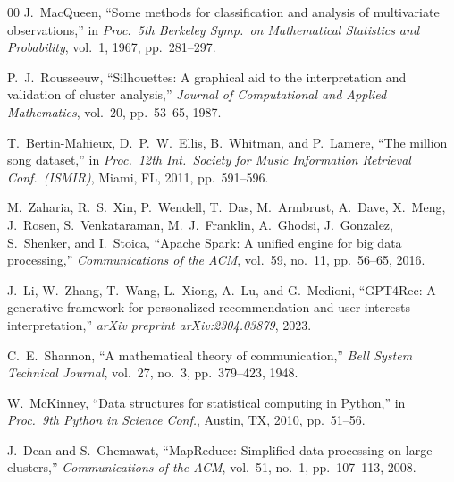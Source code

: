 \documentclass[conference]{IEEEtran}
\begin{document}
\begin{thebibliography}{00}
J.~MacQueen, ``Some methods for classification and analysis of multivariate
observations,'' in \textit{Proc.\ 5th Berkeley Symp.\ on Mathematical
Statistics and Probability}, vol.~1, 1967, pp.~281--297.

P.~J.~Rousseeuw, ``Silhouettes: A graphical aid to the interpretation and
validation of cluster analysis,'' \textit{Journal of Computational and
Applied Mathematics}, vol.~20, pp.~53--65, 1987.

T.~Bertin-Mahieux, D.~P.~W.~Ellis, B.~Whitman, and P.~Lamere, ``The million
song dataset,'' in \textit{Proc.\ 12th Int.\ Society for Music Information
Retrieval Conf.\ (ISMIR)}, Miami, FL, 2011, pp.~591--596.

M.~Zaharia, R.~S.~Xin, P.~Wendell, T.~Das, M.~Armbrust, A.~Dave,
X.~Meng, J.~Rosen, S.~Venkataraman, M.~J.~Franklin, A.~Ghodsi,
J.~Gonzalez, S.~Shenker, and I.~Stoica, ``Apache Spark: A unified engine
for big data processing,'' \textit{Communications of the ACM}, vol.~59,
no.~11, pp.~56--65, 2016.

J.~Li, W.~Zhang, T.~Wang, L.~Xiong, A.~Lu, and G.~Medioni, ``GPT4Rec:
A generative framework for personalized recommendation and user interests
interpretation,'' \textit{arXiv preprint arXiv:2304.03879}, 2023.

C.~E.~Shannon, ``A mathematical theory of communication,''
\textit{Bell System Technical Journal}, vol.~27, no.~3, pp.~379--423, 1948.

W.~McKinney, ``Data structures for statistical computing in Python,''
in \textit{Proc.\ 9th Python in Science Conf.}, Austin, TX, 2010,
pp.~51--56.

J.~Dean and S.~Ghemawat, ``MapReduce: Simplified data processing on large
clusters,'' \textit{Communications of the ACM}, vol.~51, no.~1,
pp.~107--113, 2008.

\end{thebibliography}
\end{document}
